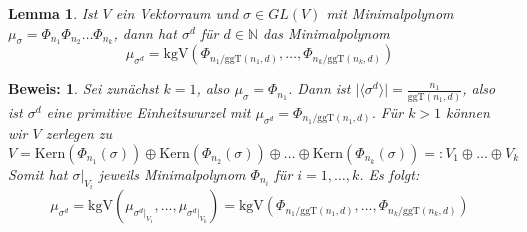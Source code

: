 \documentclass[12pt,a4paper,halfparskip,headsepline,bibtotocnumbered]{scrreprt}
\theoremstyle{nummermitklammern}
\newtheorem{lemma}[defsatzusw]{Lemma}
\theoremstyle{nonumberbreak}
\newtheorem{beweis}{Beweis:}
\newcommand{\N}{\mathbb{N}}
\newcommand{\Kern}{\text{Kern}}
\newcommand{\ggT}{\text{ggT}}
\newcommand{\kgV}{\text{kgV}}
\begin{document}
\begin{framed}
	\begin{lemma}
		Ist $V$ ein Vektorraum und $\sigma \in GL(V)$ mit Minimalpolynom $\mu_\sigma = \Phi_{n_1} \Phi_{n_2} \dots \Phi_{n_k}$, dann hat $\sigma^d$ für $d \in \N$ das Minimalpolynom
		\begin{equation*}
			\mu_{\sigma^d} = \kgV(\Phi_{n_1 / \ggT(n_1, d)}, \dots, \Phi_{n_k / \ggT(n_k,d)})
		\end{equation*}
	\end{lemma}
\end{framed}

\begin{beweis}
	Sei zunächst $k=1$, also $\mu_\sigma = \Phi_{n_1}$. Dann ist $\vert \langle \sigma^d \rangle \vert = \frac{n_1}{\ggT(n_1,d)}$, also ist $\sigma^d$ eine primitive Einheitswurzel mit $\mu_{\sigma^d} = \Phi_{n_1/\ggT(n_1,d)}$.
	Für $k > 1$ können wir $V$ zerlegen zu 
	\begin{equation*}
		V = \Kern(\Phi_{n_1}(\sigma)) \oplus \Kern(\Phi_{n_2}(\sigma)) \oplus \dots \oplus \Kern(\Phi_{n_k}(\sigma)) =: V_1 \oplus \dots \oplus V_k
	\end{equation*}
	Somit hat $\sigma\vert_{V_i}$ jeweils Minimalpolynom $\Phi_{n_i}$ für $i=1,\dots, k$. Es folgt:
	\begin{equation*}
		\mu_{\sigma^d} = \kgV( \mu_{\sigma^d \vert_{V_1}}, \dots, \mu_{\sigma^d\vert_{V_k}}) = \kgV(\Phi_{n_1 / \ggT(n_1, d)}, \dots, \Phi_{n_k / \ggT(n_k,d)})
	\end{equation*}
\end{beweis}
\end{document}
